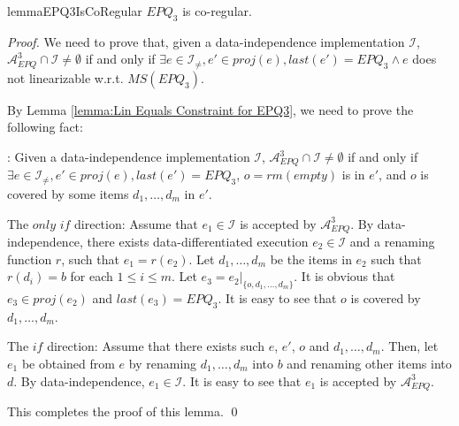 \begin{restatable}{lemma}{EPQ3IsCoRegular}
\label{lemma:EPQ3 is co-regular}
$\textit{EPQ}_3$ is co-regular.
\end{restatable}

\begin {proof}

We need to prove that, given a data-independence implementation $\mathcal{I}$, $\mathcal{A}_{\textit{EPQ}}^3 \cap \mathcal{I} \neq \emptyset$ if and only if $\exists e \in \mathcal{I}_{\neq},e' \in \textit{proj}(e), last(e')=\textit{EPQ}_3 \wedge e$ does not linearizable w.r.t. $\textit{MS}(\textit{EPQ}_3)$.

By Lemma \ref{lemma:Lin Equals Constraint for EPQ3}, we need to prove the following fact:

: Given a data-independence implementation $\mathcal{I}$, $\mathcal{A}_{\textit{EPQ}}^3 \cap \mathcal{I} \neq \emptyset$ if and only if $\exists e \in \mathcal{I}_{\neq},e' \in \textit{proj}(e), last(e')=\textit{EPQ}_3$, $o = \textit{rm}(\textit{empty})$ is in $e'$, and $o$ is covered by some items $d_1,\ldots,d_m$ in $e'$.


\noindent The $\textit{only if}$ direction: Assume that $e_1 \in \mathcal{I}$ is accepted by $\mathcal{A}_{\textit{EPQ}}^3$. By data-independence, there exists data-differentiated execution $e_2 \in \mathcal{I}$ and a renaming function $r$, such that $e_1=r(e_2)$. Let $d_1,\ldots,d_m$ be the items in $e_2$ such that $r(d_i)=b$ for each $1 \leq i \leq m$. Let $e_3 = e_2 \vert_{ \{ o, d_1, \ldots, d_m \} }$. It is obvious that $e_3 \in \textit{proj}(e_2)$ and $\textit{last}(e_3) = \textit{EPQ}_3$. It is easy to see that $o$ is covered by $d_1,\ldots,d_m$.

\noindent The $\textit{if}$ direction: Assume that there exists such $e$, $e'$, $o$ and $d_1,\ldots,d_m$. Then, let $e_1$ be obtained from $e$ by renaming $d_1,\ldots,d_m$ into $b$ and renaming other items into $d$. By data-independence, $e_1 \in \mathcal{I}$. It is easy to see that $e_1$ is accepted by $\mathcal{A}_{\textit{EPQ}}^3$.

This completes the proof of this lemma. \qed
\end {proof}


